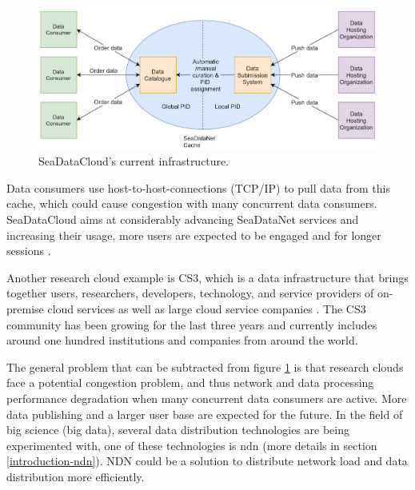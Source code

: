 \begin{figure}[H]
\centering
\includegraphics[scale=0.57]{Images/SDC_current.png}
\caption{SeaDataCloud's current infrastructure.}
\label{fig:sdc_cur}
\end{figure}

Data consumers use host-to-host-connections (TCP/IP) to pull data from this cache, which could cause congestion with many concurrent data consumers. SeaDataCloud aims at considerably advancing SeaDataNet services and increasing their usage, more users are expected to be engaged and for longer sessions \cite{sdc-eu}.
 
Another research cloud example is CS3, which is a data infrastructure that brings together users, researchers, developers, technology, and service providers of on-premise cloud services as well as large cloud service companies \cite{cs3}. The CS3 community has been growing for the last three years and currently includes around one hundred institutions and companies from around the world.

The general problem that can be subtracted from figure \ref{fig:sdc_cur} is that research clouds face a potential congestion problem, and thus network and data processing performance degradation when many concurrent data consumers are active. More data publishing and a larger user base are expected for the future. In the field of big science (big data), several data distribution technologies are being experimented with, one of these technologies is \gls{ndn} (more details in section \ref{introduction-ndn}). NDN could be a solution to distribute network load and data distribution more efficiently.


